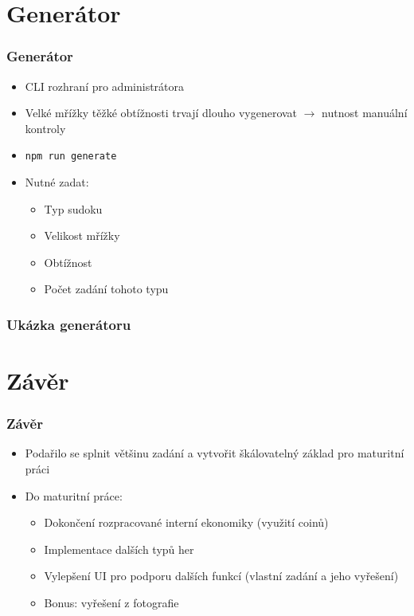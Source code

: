 \documentclass[aspectratio=43]{beamer}
\begin{document}
\section{Generátor}
\begin{frame}[fragile]
	\frametitle{Generátor}
	\begin{itemize}
		\item CLI rozhraní pro administrátora
		\item Velké mřížky těžké obtížnosti trvají dlouho vygenerovat $\rightarrow$ 
		nutnost manuální kontroly
		\item \texttt{npm run generate}
		\item Nutné zadat:
		\begin{itemize}
			\item Typ sudoku
			\item Velikost mřížky
			\item Obtížnost
			\item Počet zadání tohoto typu
		\end{itemize}
	\end{itemize}
\end{frame}

\begin{frame}[fragile]
	\frametitle{Ukázka generátoru}
\end{frame}

\section{Závěr}
\begin{frame}[fragile]
	\frametitle{Závěr}
	\begin{itemize}
		\item Podařilo se splnit většinu zadání a vytvořit škálovatelný základ pro
		      maturitní práci
		\item Do maturitní práce:
		      \begin{itemize}
			      \item Dokončení rozpracované interní ekonomiky (využití coinů)
			      \item Implementace dalších typů her
			      \item Vylepšení UI pro podporu dalších funkcí (vlastní zadání a jeho
			            vyřešení)
			      \item Bonus: vyřešení z fotografie
		      \end{itemize}
	\end{itemize}
\end{frame}
\end{document}
